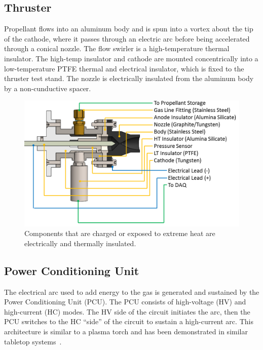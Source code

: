 \documentclass[journal]{IEEEtran}
\begin{document}
\subsection{Thruster}
Propellant flows into an aluminum body and is spun into a vortex about the tip of the cathode, where it passes through an electric arc before being accelerated through a conical nozzle.
The flow swirler is a high-temperature thermal insulator.
The high-temp insulator and cathode are mounted concentrically into a low-temperature PTFE thermal and electrical insulator, which is fixed to the thruster test stand.
The nozzle is electrically insulated from the aluminum body by a non-cunductive spacer.
\begin{figure}[htp]
  \centering
  \includegraphics[width=\linewidth]{figs/cutaway_annotated.png}
  \caption[P17101 Arcjet Annotated Cutaway]{Components that are charged or exposed to extreme heat are electrically and thermally insulated.
\label{fig:annotated-cutaway}
}
\end{figure}

\subsection{Power Conditioning Unit}
The electrical arc used to add energy to the gas is generated and sustained by the Power Conditioning Unit (PCU).
The PCU consists of high-voltage (HV) and high-current (HC) modes.
The HV side of the circuit initiates the arc, then the PCU switches to the HC ``side'' of the circuit to sustain a high-current arc.
This architecture is similar to a plasma torch and has been demonstrated in similar tabletop systems~\cite{park2015thesis}.
\end{document}
